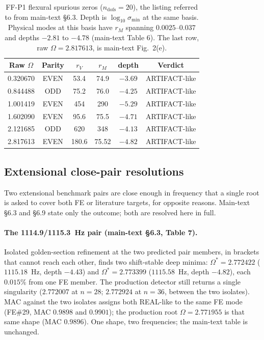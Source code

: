 \documentclass[11pt]{article}
\begin{document}
\begin{table}[!htbp]\centering\small
\caption{FF-P1 flexural spurious zeros ($n_{\mathrm{dofs}}=20$),
the listing referred to from main-text \S6.3. Depth is
$\log_{10}\sigma_{\min}$ at the same basis. Physical modes at this
basis have $r_M$ spanning $0.0025$--$0.037$ and depths $-2.81$ to
$-4.78$ (main-text Table 6). The last row, raw $\Omega=2.817613$, is
main-text Fig.~2(e).}
\label{tab:oop-spurious-sm}
\begin{tabular}{cccccc}
\toprule Raw $\Omega$ & Parity & $r_V$ & $r_M$ & depth & Verdict\\ \midrule
0.320670 & EVEN & 53.4 & 74.9 & $-3.69$ & ARTIFACT-like\\
0.844488 & ODD & 75.2 & 76.0 & $-4.25$ & ARTIFACT-like\\
1.001419 & EVEN & 454 & 290 & $-5.29$ & ARTIFACT-like\\
1.602090 & EVEN & 95.6 & 75.5 & $-4.71$ & ARTIFACT-like\\
2.121685 & ODD & 620 & 348 & $-4.13$ & ARTIFACT-like\\
2.817613 & EVEN & 180.6 & 75.52 & $-4.82$ & ARTIFACT-like\\
\bottomrule
\end{tabular}
\end{table}
\FloatBarrier

\subsection{Extensional close-pair resolutions}\label{sec:closepairs}
Two extensional benchmark pairs are close enough in frequency that a
single root is asked to cover both FE or literature targets, for
opposite reasons. Main-text \S6.3 and \S6.9 state only the outcome; both
are resolved here in full.

\paragraph{The 1114.9/1115.3~Hz pair (main-text \S6.3, Table 7).}
Isolated golden-section refinement at the two predicted pair members, in
brackets that cannot reach each other, finds two shift-stable deep
minima: $\Omega^{*}=2.772422$ ($1115.18$~Hz, depth $-4.43$) and
$\Omega^{*}=2.773399$ ($1115.58$~Hz, depth $-4.82$), each $0.015\%$ from
one FE member. The production detector still returns a single
singularity ($2.772007$ at $n{=}28$; $2.772924$ at $n{=}36$, between the
two isolates). MAC against the two isolates assigns both REAL-like to
the same FE mode (FE\#29, MAC $0.9898$ and $0.9901$); the production
root $\Omega=2.771955$ is that same shape (MAC $0.9896$). One shape, two
frequencies; the main-text table is unchanged.
\end{document}
